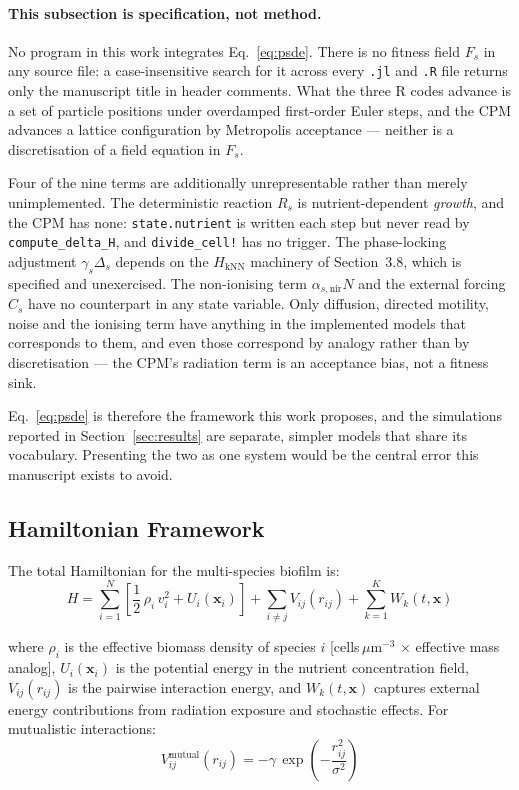 \documentclass[11pt]{article}
\begin{document}
\paragraph{This subsection is specification, not method.}
No program in this work integrates Eq.~\ref{eq:psde}. There is no fitness field $F_s$ in any
source file: a case-insensitive search for it across every \texttt{.jl} and \texttt{.R} file
returns only the manuscript title in header comments. What the three R codes advance is a set of
particle positions under overdamped first-order Euler steps, and the CPM advances a lattice
configuration by Metropolis acceptance --- neither is a discretisation of a field equation in
$F_s$.

Four of the nine terms are additionally unrepresentable rather than merely unimplemented. The
deterministic reaction $R_s$ is nutrient-dependent \emph{growth}, and the CPM has none:
\texttt{state.nutrient} is written each step but never read by \texttt{compute\_delta\_H}, and
\texttt{divide\_cell!} has no trigger. The phase-locking adjustment $\gamma_s\Delta_s$ depends on
the $H_{\mathrm{kNN}}$ machinery of Section~3.8, which is specified and unexercised. The
non-ionising term $\alpha_{s,\mathrm{nir}}N$ and the external forcing $C_s$ have no counterpart in
any state variable. Only diffusion, directed motility, noise and the ionising term have anything
in the implemented models that corresponds to them, and even those correspond by analogy rather
than by discretisation --- the CPM's radiation term is an acceptance bias, not a fitness sink.

Eq.~\ref{eq:psde} is therefore the framework this work proposes, and the simulations reported in
Section~\ref{sec:results} are separate, simpler models that share its vocabulary. Presenting the
two as one system would be the central error this manuscript exists to avoid.

\subsection{Hamiltonian Framework}
\label{sec:hamiltonian}

The total Hamiltonian for the multi-species biofilm is:
\begin{equation}
\label{eq:hamiltonian}
H = \sum_{i=1}^{N}\!\left[\frac{1}{2}\,\rho_i\,v_i^2 + U_i(\mathbf{x}_i)\right]
  + \sum_{i\neq j} V_{ij}(r_{ij})
  + \sum_{k=1}^{K} W_k(t,\mathbf{x})
\end{equation}

\noindent where $\rho_i$ is the effective biomass density of species $i$ [cells\,$\mu$m$^{-3}$
$\times$ effective mass analog], $U_i(\mathbf{x}_i)$ is the potential energy in the nutrient
concentration field, $V_{ij}(r_{ij})$ is the pairwise interaction energy, and $W_k(t,\mathbf{x})$
captures external energy contributions from radiation exposure and stochastic effects. For
mutualistic interactions:
\begin{equation}
  V_{ij}^{\mathrm{mutual}}(r_{ij}) = -\gamma\,\exp\!\left(-\frac{r_{ij}^2}{\sigma^2}\right)
\end{equation}
\end{document}
